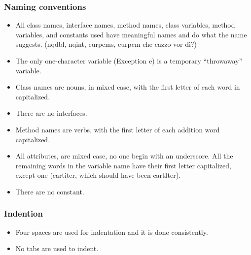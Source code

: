 \subsubsection{Naming conventions}
\begin{itemize}
\item All class names, interface names, method names, class variables, method
variables, and constants used have meaningful names and do
what the name suggests. (nqdbl, nqint, curpcms, curpcm che cazzo vor dì?) \\

\item The only one-character variable (Exception e) is a temporary
“throwaway” variable.\\

\item Class names are nouns, in mixed case, with the first letter of each word
in capitalized.\\

\item There are no interfaces.\\

\item Method names are verbs, with the first letter of each addition
word capitalized.\\

\item All attributes, are mixed case, no one begin
with an underscore. All the
remaining words in the variable name have their first letter capitalized, except one (cartiter, which should have been cartIter).
 \\
 
 \item There are no constant.\\
\end{itemize}

\subsubsection{Indention}
\begin{itemize}
\item Four spaces are used for indentation and it is done consistently. \\
\item No tabs are used to indent.\\
\end{itemize}


